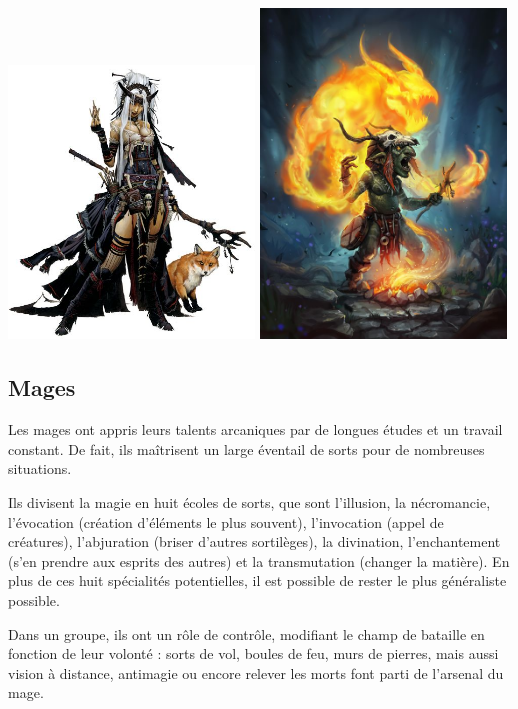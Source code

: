 \documentclass[10pt,a4paper]{book}
\begin{document}
\includegraphics[width=0.49\textwidth]{sorcier 1}
\includegraphics[width=0.49\textwidth]{sorcier 2}
\subsection{Mages}
Les mages ont appris leurs talents arcaniques par de longues études et un travail constant. De fait, ils maîtrisent un large éventail de sorts pour de nombreuses situations.

Ils divisent la magie en huit écoles de sorts, que sont l'illusion, la nécromancie, l'évocation (création d'éléments le plus souvent), l'invocation (appel de créatures), l'abjuration (briser d'autres sortilèges), la divination, l'enchantement (s'en prendre aux esprits des autres) et la transmutation (changer la matière). En plus de ces huit spécialités potentielles, il est possible de rester le plus généraliste possible.

Dans un groupe, ils ont un rôle de contrôle, modifiant le champ de bataille en fonction de leur volonté : sorts de vol, boules de feu, murs de pierres, mais aussi vision à distance, antimagie ou encore relever les morts font parti de l'arsenal du mage.
\end{document}
